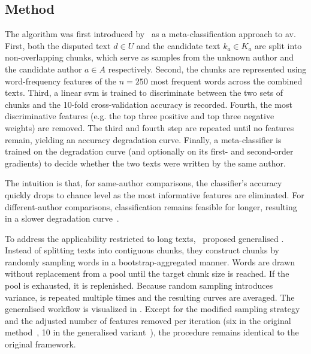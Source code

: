 \subsection{\unmasking{} Method}
\label{subsec:unmasking}

The \unmasking{} algorithm was first introduced by \citet{koppel_authorship_2004}\ as a meta-classification approach to \ac{av}. 
First, both the disputed text $d \in U$ and the candidate text $k_a \in K_a$ are split into non-overlapping chunks, which serve as samples from the unknown author and the candidate author $a \in A$ respectively. 
Second, the chunks are represented using word-frequency features of the $n=250$ most frequent words across the combined texts.
Third, a linear \ac{svm} is trained to discriminate between the two sets of chunks and the 10-fold cross-validation accuracy is recorded.
Fourth, the most discriminative features (e.g. the top three positive and top three negative weights) are removed.  
The third and fourth step are repeated until no features remain, yielding an accuracy degradation curve.  
Finally, a meta-classifier is trained on the degradation curve (and optionally on its first- and second-order gradients) to decide whether the two texts were written by the same author.  

The intuition is that, for same-author comparisons, the classifier’s accuracy quickly drops to chance level as the most informative features are eliminated. 
For different-author comparisons, classification remains feasible for longer, resulting in a slower degradation curve~\citep{stein_intrinsic_2011,tyo_state_2022,bevendorff_divergence_based_2020,stamatatos_survey_2009}. 

To address the applicability restricted to long texts, \citet{bevendorff_generalizing_2019,bevendorff_divergence_based_2020}\ proposed generalised \unmasking{}. 
Instead of splitting texts into contiguous chunks, they construct chunks by randomly sampling words in a bootstrap-aggregated manner. 
Words are drawn without replacement from a pool until the target chunk size is reached.
If the pool is exhausted, it is replenished. 
Because random sampling introduces variance, \unmasking{} is repeated multiple times and the resulting curves are averaged. 
The generalised \unmasking{} workflow is visualized in . 
Except for the modified sampling strategy and the adjusted number of features removed per iteration (six in the original method~\citep{koppel_authorship_2004}, 10 in the generalised variant~\citep{bevendorff_generalizing_2019}), the procedure remains identical to the original \unmasking{} framework.

